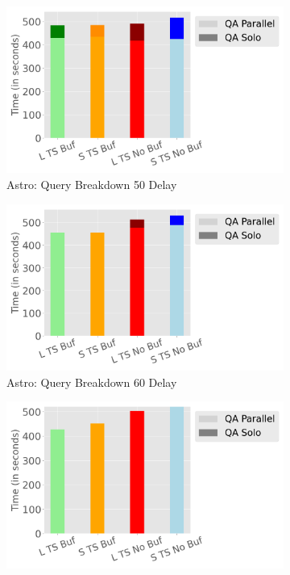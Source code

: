 \begin{figure}
	\centering
	\begin{subfigure}[c]{0.48\textwidth}
		\includegraphics[width=1\textwidth]   {figures/Experiments/Dynamic/ASTRO/breakdown_astro_50.png}
		\caption{Astro: Query Breakdown 50 Delay}
		\label{fig:actual-query-breakdown-50-astro}
	\end{subfigure}
	\begin{subfigure}[c]{0.48\textwidth}
		\includegraphics[width=1\textwidth]	 {figures/Experiments/Dynamic/ASTRO/breakdown_astro_60.png}
		\caption{Astro: Query Breakdown 60 Delay}
		\label{fig:actual-query-breakdown-60-astro}
	\end{subfigure}
	\begin{subfigure}[c]{0.48\textwidth}
		\includegraphics[width=1\textwidth]	 {figures/Experiments/Dynamic/ASTRO/breakdown_astro_70.png}

\end{subfigure}
\end{figure}

